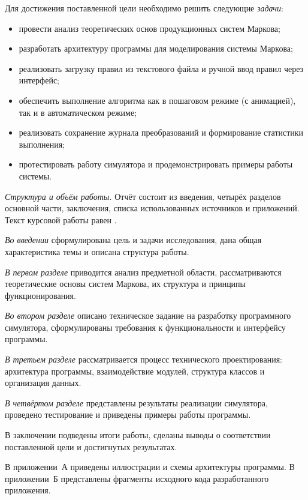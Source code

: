 Для достижения поставленной цели необходимо решить следующие \emph{задачи}:
\begin{itemize}
	\item провести анализ теоретических основ продукционных систем Маркова;
	\item разработать архитектуру программы для моделирования системы Маркова;
	\item реализовать загрузку правил из текстового файла и ручной ввод правил через интерфейс;
	\item обеспечить выполнение алгоритма как в пошаговом режиме (с анимацией), так и в автоматическом режиме;
	\item реализовать сохранение журнала преобразований и формирование статистики выполнения;
	\item протестировать работу симулятора и продемонстрировать примеры работы системы.
\end{itemize}

\emph{Структура и объём работы.} Отчёт состоит из введения, четырёх разделов основной части, заключения, списка использованных источников и приложений. Текст курсовой работы равен .

\emph{Во введении} сформулирована цель и задачи исследования, дана общая характеристика темы и описана структура работы.

\emph{В первом разделе} приводится анализ предметной области, рассматриваются теоретические основы систем Маркова, их структура и принципы функционирования.

\emph{Во втором разделе} описано техническое задание на разработку программного симулятора, сформулированы требования к функциональности и интерфейсу программы.

\emph{В третьем разделе} рассматривается процесс технического проектирования: архитектура программы, взаимодействие модулей, структура классов и организация данных.

\emph{В четвёртом разделе} представлены результаты реализации симулятора, проведено тестирование и приведены примеры работы программы.

В заключении подведены итоги работы, сделаны выводы о соответствии поставленной цели и достигнутых результатах.

В приложении~А приведены иллюстрации и схемы архитектуры программы.  
В приложении~Б представлены фрагменты исходного кода разработанного приложения.